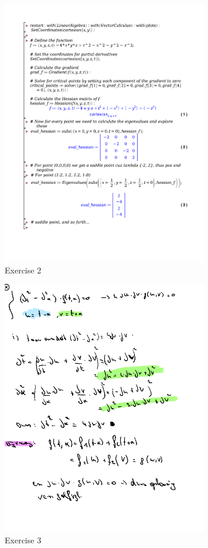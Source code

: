 \documentclass[a4paper]{report}
\begin{document}


\begin{figure}[H]
	\centering
	\includegraphics[width=0.8\textwidth]{exercises/bord_4_ex_2.pdf}
	\caption{Exercise 2}
	\label{fig:bord_4_ex_2}
\end{figure}


\begin{figure}[H]
	\centering
	\includegraphics[width=0.8\textwidth]{assets/bord_4_ex_3.png}
	\caption{Exercise 3}
	\label{fig:bord_4_ex_3}
\end{figure}
\end{document}
